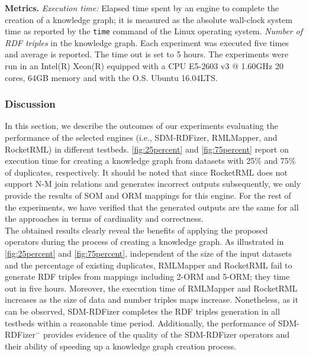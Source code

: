 \noindent\textbf{Metrics.} \textit{Execution time:} Elapsed time spent by an engine to complete the creation of a knowledge graph; it is measured as the absolute wall-clock system time as reported by the \verb|time| command of the Linux operating system. \textit{Number of RDF triples} in the knowledge graph. Each experiment was executed five times and average is reported. The time out is set to 5 hours. The experiments were run in an Intel(R) Xeon(R) equipped with a CPU E5-2603 v3 @ 1.60GHz 20 cores, 64GB memory and with the O.S. Ubuntu 16.04LTS.

\subsubsection{Discussion}
In this section, we describe the outcomes of our experiments evaluating the performance of the selected engines (i.e., SDM-RDFizer, RMLMapper, and RocketRML) in different testbeds.
\autoref{fig:25percent} and \autoref{fig:75percent} report on execution time for creating a knowledge graph from datasets with 25\% and 75\% of duplicates, respectively. It should be noted that since RocketRML does not support N-M join relations and generates incorrect outputs subsequently, we only provide the results of SOM and ORM mappings for this engine. For the rest of the experiments, we have verified that the generated outputs are the same for all the approaches in terms of cardinality and correctness.\\
\noindent The obtained results clearly reveal the benefits of applying the proposed operators during the process of creating a knowledge graph. As illustrated in \autoref{fig:25percent} and \autoref{fig:75percent}, independent of the size of the input datasets and the percentage of existing duplicates, RMLMapper and RocketRML fail to generate RDF triples from mappings including 2-ORM and 5-ORM; they time out in five hours. Moreover, the execution time of RMLMapper and RocketRML increases as the size of data and number triples maps increase. Nonetheless, as it can be observed, SDM-RDFizer completes the RDF triples generation in all testbeds within a reasonable time period. Additionally, the performance of SDM-RDFizer$^-$ provides evidence of the quality of the SDM-RDFizer operators and their ability of speeding up a knowledge graph creation process.       


